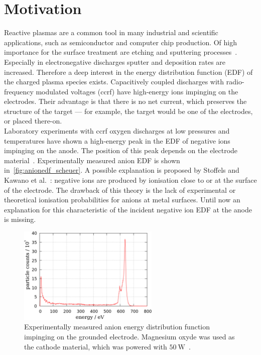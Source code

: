 %
	\chapter*{Motivation}
%
%
        Reactive plasmas are a common tool in many industrial and scientific applications, such as semiconductor and computer chip production. Of high importance for the surface treatment are etching and sputtering processes~\cite{Cvelbar05,Zeuner98}. Especially in electronegative discharges sputter and deposition rates are increased. Therefore a deep interest in the energy distribution function (EDF) of the charged plasma species exists. Capacitively coupled discharges with radio-frequency modulated voltages (ccrf) have high-energy ions impinging on the electrodes. Their advantage is that there is no net current, which preserves the structure of the target --- for example, the target would be one of the electrodes, or placed there-on.\\
        Laboratory experiments with ccrf oxygen discharges at low pressures and temperatures have shown a high-energy peak in the EDF of negative ions impinging on the anode. The position of this peak depends on the electrode material~\cite{Scheuer15}. Experimentally measured anion EDF is shown in~\autoref{fig:anionedf_scheuer}. A possible explanation is proposed by Stoffels and Kawano et al.~\cite{Stoffels01,Kawano83}: negative ions are produced by ionisation close to or at the surface of the electrode. The drawback of this theory is the lack of experimental or theoretical ionisation probabilities for anions at metal surfaces. Until now an explanation for this characteristic of the incident negative ion EDF at the anode is missing.
%
        \begin{figure}[!h]
            \centering
            \includegraphics[width=0.6\textwidth]{figures/scheuer_anionedf.pdf}
            \caption{Experimentally measured anion energy distribution function impinging on the grounded electrode. Magnesium oxyde was used as the cathode material, which was powered with $\SI{50}{\watt}$~\cite{Scheuer15}.}
            \label{fig:anionedf_scheuer}
        \end{figure}
